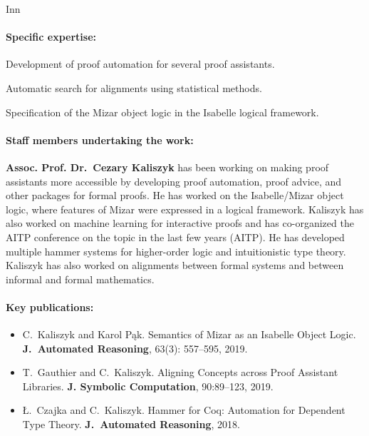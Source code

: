 \begin{sitedescription}{Inn}

\paragraph{Specific expertise:}

\begin{compactitem}
\item Development of proof automation for several proof assistants.
\item Automatic search for alignments using statistical methods.
\item Specification of the Mizar object logic in the Isabelle logical framework.
\end{compactitem}

\paragraph{Staff members undertaking the work:}

\textbf{Assoc. Prof. Dr.\ Cezary Kaliszyk} has been working on making proof assistants
more accessible by developing proof automation, proof advice, and other packages for formal
proofs. He has worked on the Isabelle/Mizar object logic, where features of Mizar were
expressed in a logical framework. Kaliszyk has also worked on machine learning for interactive
proofs and has co-organized the AITP conference on the topic in the last few years (AITP). He
has developed multiple hammer systems for higher-order logic and intuitionistic type theory.
Kaliszyk has also worked on alignments between formal systems and between informal and formal
mathematics.


\paragraph{Key publications:}
\begin{itemize}
\item
C.~Kaliszyk and Karol Pąk.
\newblock Semantics of Mizar as an Isabelle Object Logic.
\textbf{J.~Automated Reasoning}, 63(3): 557--595, 2019.

\item
T.~Gauthier and C.~Kaliszyk.
\newblock Aligning Concepts across Proof Assistant Libraries.
\textbf{J. Symbolic Computation}, 90:89--123, 2019.

\item
Ł.~Czajka and C.~Kaliszyk.
\newblock Hammer for Coq: Automation for Dependent Type Theory.
\textbf{J.~Automated Reasoning}, 2018.
\end{itemize}

\end{sitedescription}

